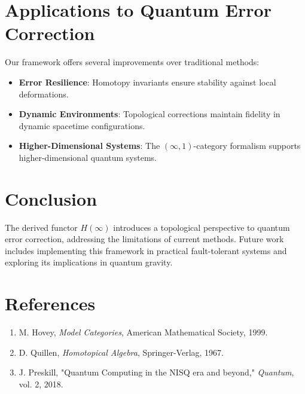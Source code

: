 \documentclass[11pt]{article}
\begin{document}
\section{Applications to Quantum Error Correction}
Our framework offers several improvements over traditional methods:
\begin{itemize}
    \item \textbf{Error Resilience}: Homotopy invariants ensure stability against local deformations.
    \item \textbf{Dynamic Environments}: Topological corrections maintain fidelity in dynamic spacetime configurations.
    \item \textbf{Higher-Dimensional Systems}: The \((\infty,1)\)-category formalism supports higher-dimensional quantum systems.
\end{itemize}

\section{Conclusion}
The derived functor \( H(\infty) \) introduces a topological perspective to quantum error correction, addressing the limitations of current methods. Future work includes implementing this framework in practical fault-tolerant systems and exploring its implications in quantum gravity.

\section*{References}
\begin{enumerate}
    \item M. Hovey, \textit{Model Categories}, American Mathematical Society, 1999.
    \item D. Quillen, \textit{Homotopical Algebra}, Springer-Verlag, 1967.
    \item J. Preskill, "Quantum Computing in the NISQ era and beyond," \textit{Quantum}, vol. 2, 2018.
\end{enumerate}
\end{document}
